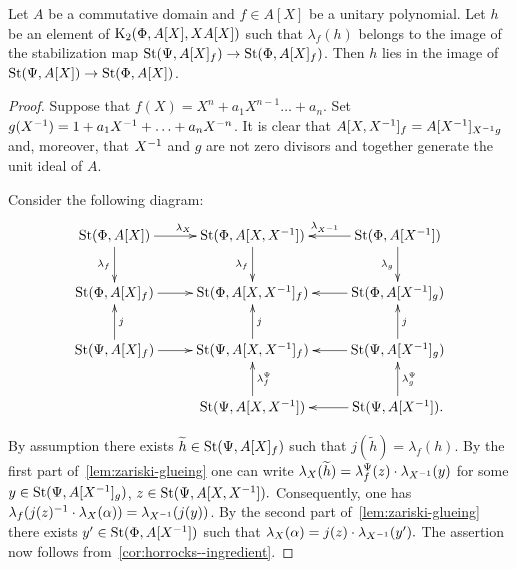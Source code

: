 \begin{lemma} \label{lem:horrocks-b}
 Let $A$ be a commutative domain and $f \in A[X]$ be a unitary polynomial.
 Let $h$ be an element of $\operatorname{K}_2(\Phi, A[X], XA[X])$ such that $\lambda_f(h)$ belongs to the image of the stabilization map
 $\operatorname{St}(\Psi, A[X]_f) \to \operatorname{St}(\Phi, A[X]_f)$.
 Then $h$ lies in the image of $\operatorname{St}(\Psi, A[X]) \to \operatorname{St}(\Phi, A[X])$.
\end{lemma}
\begin{proof}
    Suppose that $f(X) = X^n + a_1 X^{n-1} \ldots + a_n$.
    Set $g(X^{-1}) = 1 + a_1 X^{-1} + \ldots + a_{n} X^{-n}$.
    It is clear that $A[X, X^{-1}]_f = A[X^{-1}]_{X^{-1} g}$ and, moreover, that $X^{-1}$ and $g$ are not zero divisors and together generate the unit ideal of $A$.

    Consider the following diagram:
    \[ \xymatrix{\St(\Phi, A[X]) \ar[r]^{\lambda_X} \ar[d]_{\lambda_f} & \St(\Phi, A[X, X\inv]) \ar[d]_{\lambda_f}  & \St(\Phi, A[X\inv]) \ar[l]_{\lambda_{X\inv}} \ar[d]_{\lambda_g}  \\
                 \St(\Phi, A[X]_f) \ar[r] & \St(\Phi, A[X, X\inv]_f) & \St(\Phi, A[X\inv]_g) \ar[l] \\
                 \St(\Psi, A[X]_f) \ar[r] \ar[u]_j & \St(\Psi, A[X, X\inv]_f) \ar[u]_j & \St(\Psi, A[X\inv]_g) \ar[l] \ar[u]_j \\
                                   & \St(\Psi, A[X, X\inv]) \ar[u]_{\lambda_f^\Psi}   & \St(\Psi, A[X\inv]). \ar[l] \ar[u]_{\lambda_g^\Psi}}\]

    By assumption there exists $\widetilde{h} \in \operatorname{St}(\Psi, A[X]_f)$ such that $j(\widetilde{h}) = \lambda_f(h)$.
    By the first part of~\cref{lem:zariski-glueing} one can write 
     $\lambda_X(\widetilde{h}) = \lambda_f^\Psi(z) \cdot \lambda_{X^{-1}}(y)$
     for some $y \in \operatorname{St}(\Psi, A[X^{-1}]_g)$, $z \in \operatorname{St}(\Psi, A[X, X^{-1}]).$
    Consequently, one has $\lambda_f(j(z)^{-1} \cdot \lambda_X(\alpha)) = \lambda_{X^{-1}}(j(y))$.
    By the second part of~\cref{lem:zariski-glueing} there exists $y' \in \operatorname{St}(\Phi, A[X^{-1}])$ such that $\lambda_X(\alpha) = j(z) \cdot \lambda_{X^{-1}}(y').$
    The assertion now follows from~\cref{cor:horrocks--ingredient}.
\end{proof}

